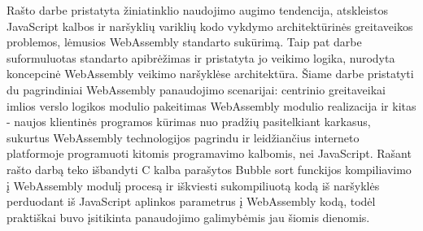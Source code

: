 \documentclass{VUMIFPSkursinis}
\begin{document}
Rašto darbe pristatyta žiniatinklio naudojimo augimo tendencija, atskleistos JavaScript kalbos ir naršyklių variklių kodo vykdymo architektūrinės greitaveikos problemos, lėmusios WebAssembly standarto sukūrimą. Taip pat darbe suformuluotas standarto apibrėžimas ir pristatyta jo veikimo logika, nurodyta koncepcinė WebAssembly veikimo naršyklėse architektūra. Šiame darbe pristatyti du pagrindiniai WebAssembly panaudojimo scenarijai: centrinio greitaveikai imlios verslo logikos modulio pakeitimas WebAssembly modulio realizacija ir kitas - naujos klientinės programos kūrimas nuo pradžių pasitelkiant karkasus, sukurtus WebAssembly technologijos pagrindu ir leidžiančius interneto platformoje programuoti kitomis programavimo kalbomis, nei JavaScript. Rašant rašto darbą teko išbandyti C kalba parašytos Bubble sort funckijos kompiliavimo į WebAssembly modulį procesą ir iškviesti sukompiliuotą kodą iš naršyklės perduodant iš JavaScript aplinkos parametrus į WebAssembly kodą, todėl praktiškai buvo įsitikinta panaudojimo galimybėmis jau šiomis dienomis.
\end{document}

